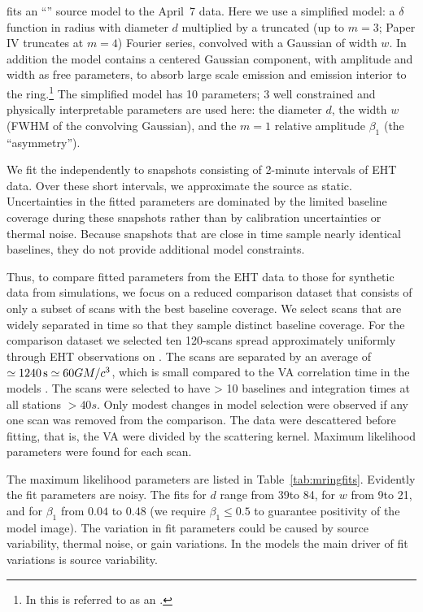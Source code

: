  fits an ``\mring'' source model to the April~7 data.  Here we use a simplified \mring model: a $\delta$ function in radius with diameter $d$ multiplied by a truncated (up to $m = 3$; Paper IV truncates at $m = 4$) Fourier series, convolved with a Gaussian of width $w$.  In addition the model contains a centered Gaussian component, with amplitude and width as free parameters, to absorb large scale emission and emission interior to the ring.\footnote{In \cite{PaperIV} this is referred to as an \mring.}  The simplified \mring model has 10 parameters; 3 well constrained and physically interpretable parameters are used here: the \mring diameter $d$, the \mring width $w$ (FWHM of the convolving  Gaussian), and the $m=1$ relative amplitude $\beta_1$ (the ``asymmetry'').

We fit the \mring independently to snapshots consisting of 2-minute intervals of EHT data. Over these short intervals, we approximate the source as static.  Uncertainties in the fitted \mring parameters are dominated by the limited baseline coverage during these snapshots rather than by calibration uncertainties or thermal noise. Because snapshots that are close in time sample nearly identical baselines, they do not provide additional model constraints.

Thus, to compare fitted \mring parameters from the EHT data to those for synthetic data from simulations, we focus on a reduced comparison dataset that consists of only a subset of scans with the best baseline coverage. We select scans that are widely separated in time so that they sample distinct baseline coverage. For the comparison dataset we selected ten 120-\sec scans spread approximately uniformly through EHT observations on \aprilvii.  The scans are separated by an average of $\simeq 1240\,\mathrm{s} \simeq 60 GM/c^3$, which is small compared to the VA correlation time in the models \citep{Georgiev_2022}. The scans were selected to have > 10 baselines and integration times at all stations $> 40s$.  Only modest changes in model selection were observed if any one scan was removed from the comparison.  The data were descattered before fitting, that is, the VA were divided by the scattering kernel.  Maximum likelihood \mring parameters were found for each scan.

The maximum likelihood \mring parameters are listed in Table~\ref{tab:mringfits}.  Evidently the fit parameters are noisy.  The fits for $d$ range from 39\uas to 84\uas, for $w$ from 9\uas to 21\uas, and for $\beta_1$ from $0.04$ to $0.48$ (we require $\beta_1 \le 0.5$ to guarantee  positivity of the model image).  The variation in fit parameters could be caused by source variability, thermal noise, or gain variations.  In the models the main driver of fit variations is source variability.

